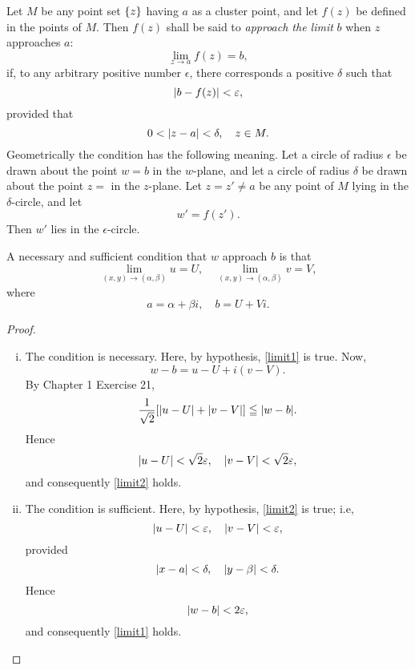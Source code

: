 \documentclass[twosided]{memoir}
\begin{document}
Let $M$ be any point set $\cbr*{z} $ having $a$ as a cluster point, and let $f(z)$ be defined in the points of $M$. Then $f(z)$ shall be said to \emph{approach the limit} $b$ when $z$ approaches $a$:
\[
	\lim\limits_{z \to a} f(z)=b
,\] if, to any arbitrary positive number $\epsilon$, there corresponds a positive $\delta $ such that
\begin{equation}\label{limit1}
	\abs*{b-f(z)} <\epsilon,
\end{equation} 
provided that
\[
0<\abs*{z-a} <\delta , \quad z \in M
.\] Geometrically the condition has the following meaning. Let a circle of radius $\epsilon$ be drawn about the point $w=b$ in the $w $-plane, and let a circle of radius $\delta $ be drawn about the point $z=$ in the $z$-plane. Let $z=z'\neq a$ be any point of $M$ lying in the $\delta $-circle, and let
\[
	w'=f(z')
.\] Then $w'$ lies in the $\epsilon$-circle.
\begin{figure}[htbp]
\centering
{}
\end{figure}

\begin{theorem}\label{2.2.1}
A necessary and sufficient condition that $w$ approach $b$ is that
\begin{equation}\label{limit2}
	\lim\limits_{(x,y) \to (\alpha , \beta)} u=U, \quad \lim\limits_{(x,y) \to (\alpha , \beta)} v=V,
\end{equation} 
where
 \[
a=\alpha +\beta i, \quad b=U+Vi
.\] 
\end{theorem} 

\begin{proof}
\begin{enumerate}[i.]
	\item The condition is necessary. Here, by hypothesis, \ref{limit1} is true. Now,
		\[
			w-b=u-U+i(v-V)
		.\] By Chapter 1 Exercise 21,
		\[
		\frac{1}{\sqrt{2} }\sbr*{\abs*{u-U} +\abs*{v-V} } \le \abs*{w-b} 
		.\] Hence
		\[
		\abs*{u-U} < \sqrt{2} \epsilon, \quad \abs*{v-V} <\sqrt{2} \epsilon
	,\] and consequently \ref{limit2} holds. 

\item The condition is sufficient. Here, by hypothesis, \ref{limit2} is true; i.e,
	\[
	\abs*{u-U} <\epsilon, \quad \abs*{v-V} <\epsilon	
	,\] provided
	\[
	\abs*{x-a} <\delta , \quad \abs*{y-\beta} <\delta 
	.\] Hence
	\[
	\abs*{w-b} <2\epsilon
,\] and consequently \ref{limit1} holds. 
\end{enumerate}
\end{proof} 
\end{document}
